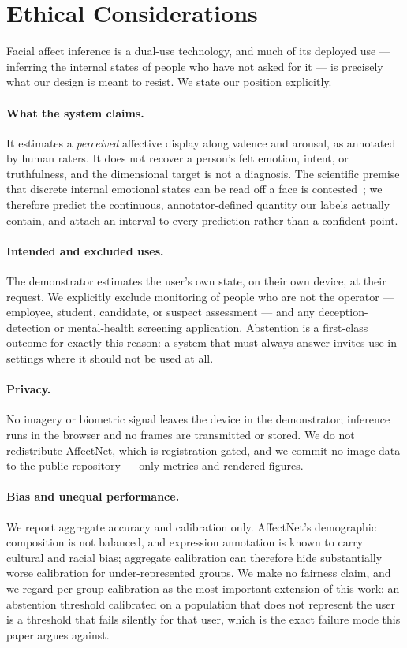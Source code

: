 \section{Ethical Considerations}
\label{sec:ethics}

Facial affect inference is a dual-use technology, and much of its deployed use
--- inferring the internal states of people who have not asked for it --- is
precisely what our design is meant to resist. We state our position explicitly.

\paragraph{What the system claims.} It estimates a \emph{perceived} affective
display along valence and arousal, as annotated by human raters. It does not
recover a person's felt emotion, intent, or truthfulness, and the dimensional
target is not a diagnosis. The scientific premise that discrete internal
emotional states can be read off a face is contested~\cite{russell1980circumplex};
we therefore predict the continuous, annotator-defined quantity our labels
actually contain, and attach an interval to every prediction rather than a
confident point.

\paragraph{Intended and excluded uses.} The demonstrator estimates the user's own
state, on their own device, at their request. We explicitly exclude monitoring of
people who are not the operator --- employee, student, candidate, or suspect
assessment --- and any deception-detection or mental-health screening
application. Abstention is a first-class outcome for exactly this reason: a
system that must always answer invites use in settings where it should not be
used at all.

\paragraph{Privacy.} No imagery or biometric signal leaves the device in the
demonstrator; inference runs in the browser and no frames are transmitted or
stored. We do not redistribute AffectNet, which is registration-gated, and we
commit no image data to the public repository --- only metrics and rendered
figures.

\paragraph{Bias and unequal performance.} We report aggregate accuracy and
calibration only. AffectNet's demographic composition is not balanced, and
expression annotation is known to carry cultural and racial bias; aggregate
calibration can therefore hide substantially worse calibration for
under-represented groups. We make no fairness claim, and we regard per-group
calibration as the most important extension of this work: an abstention threshold
calibrated on a population that does not represent the user is a threshold that
fails silently for that user, which is the exact failure mode this paper argues
against.
